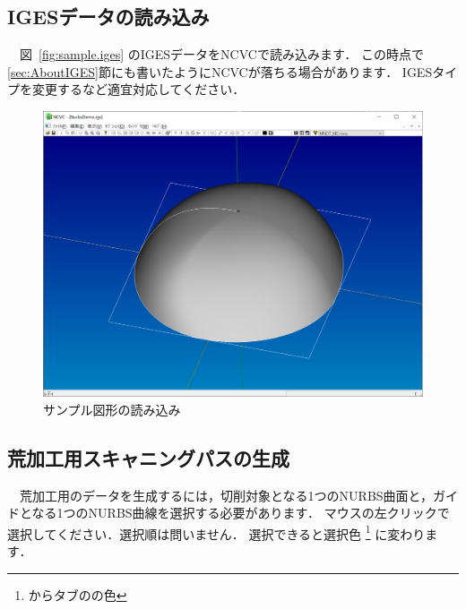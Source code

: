 
\subsection{IGESデータの読み込み}
　図~\ref{fig:sample.iges} のIGESデータをNCVCで読み込みます．
この時点で \ref{sec:AboutIGES}節にも書いたようにNCVCが落ちる場合があります．
IGESタイプを変更するなど適宜対応してください．

\begin{figure}[H]
\centering
\includegraphics[scale=0.5]{No2/fig/fig21.png}
\caption{サンプル図形の読み込み}
\label{fig:ncvc21}
\end{figure}

\subsection{荒加工用スキャニングパスの生成}
　荒加工用のデータを生成するには，切削対象となる1つのNURBS曲面と，ガイドとなる1つのNURBS曲線を選択する必要があります．
マウスの左クリックで選択してください．選択順は問いません．
選択できると選択色
\footnote{からタブのの色}
に変わります．

